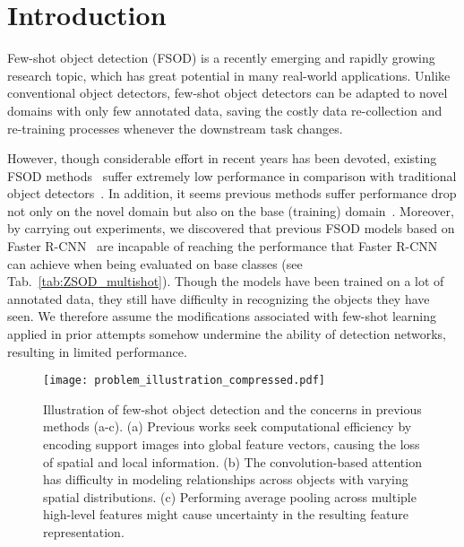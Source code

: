 \documentclass[journal]{IEEEtran}
\begin{document}
\section{Introduction}
Few-shot object detection (FSOD) is a recently emerging and rapidly growing research topic, which has great potential in many real-world applications.
Unlike conventional object detectors, few-shot object detectors can be adapted to novel domains with only few annotated data, saving the costly data re-collection and re-training processes whenever the downstream task changes.


However, though considerable effort in recent years has been devoted, existing FSOD methods~\cite{kang2019few, yan2019meta, fan2020few, perez2020incremental, wu2020multi} suffer extremely low performance in comparison with traditional object detectors~\cite{ren2015faster, lin2017focal}.
In addition, it seems previous methods suffer performance drop not only on the novel domain but also on the base (training) domain~\cite{wang2020frustratingly, perez2020incremental}.
Moreover, by carrying out experiments, we discovered that previous FSOD models based on Faster R-CNN~\cite{ren2015faster} are incapable of reaching the performance that Faster R-CNN can achieve when being evaluated on base classes (see Tab.~\ref{tab:ZSOD_multishot}).
Though the models have been trained on a lot of annotated data, they still have difficulty in recognizing the objects they have seen.
We therefore assume the modifications associated with few-shot learning applied in prior attempts somehow undermine the ability of detection networks, resulting in limited performance.





\begin{figure*}[t!]
    \centering
    \texttt{[image: problem\_illustration\_compressed.pdf]}
    \caption{Illustration of few-shot object detection and the concerns in previous methods (a-c). (a) Previous works seek computational efficiency by encoding support images into global feature vectors, causing the loss of spatial and local information. (b) The convolution-based attention has difficulty in modeling relationships across objects with varying spatial distributions. (c) Performing average pooling across multiple high-level features might cause uncertainty in the resulting feature representation.}
    \label{fig:illustration}
\end{figure*}
\end{document}
